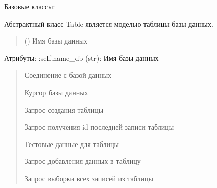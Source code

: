 \documentclass[letterpaper,10pt,russian]{sphinxmanual}
\begin{document}
\begin{fulllineitems}
\label{\detokenize{database.sqlite3_interface.tables:database.sqlite3_interface.tables.table.Table}}
\pysigstartsignatures
{}
\pysigstopsignatures
\sphinxAtStartPar
Базовые классы: 

\sphinxAtStartPar
Абстрактный класс Table \sphinxhyphen{} является моделью таблицы базы данных.
\begin{quote}\begin{description}
\sphinxAtStartPar
{} () \textendash{} Имя базы данных

\end{description}\end{quote}

\sphinxAtStartPar
Атрибуты:
:self.name\_db (str): Имя базы данных
\begin{quote}\begin{description}
\sphinxAtStartPar
Соединение с базой данных

\sphinxAtStartPar
Курсор базы данных

\sphinxAtStartPar
Запрос создания таблицы

\sphinxAtStartPar
Запрос получения id последней записи таблицы

\sphinxAtStartPar
Тестовые данные для таблицы

\sphinxAtStartPar
Запрос добавления данных в таблицу

\sphinxAtStartPar
Запрос выборки всех записей из таблицы

\end{description}\end{quote}


\end{fulllineitems}
\end{document}

